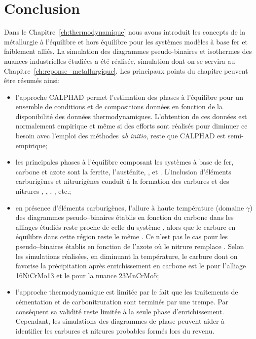 \clearpage\section{Conclusion}

Dans le Chapitre~\ref{ch:thermodynamique} nous avons introduit les concepts de la métallurgie à l'équilibre et hors équilibre pour les systèmes modèles à base fer et faiblement alliés. La simulation des diagrammes pseudo-binaires et isothermes des nuances industrielles étudiées a été réalisée, simulation dont on se servira au Chapitre~\ref{ch:reponse_metallurgique}. Les principaux points du chapitre peuvent être résumés ainsi:
\begin{itemize}
  \item l'approche CALPHAD permet l'estimation des phases à l'équilibre pour un ensemble de conditions et de compositions données en fonction de la disponibilité des données thermodynamiques. L'obtention de ces données est normalement empirique et même si des efforts sont réalisés pour diminuer ce besoin avec l'emploi des méthodes \textit{ab initio}, reste que CALPHAD est semi-empirique;
  
  \item les principales phases à l'équilibre composant les systèmes à base de fer, carbone et azote sont la ferrite, l'austénite, ,  et . L'inclusion d'éléments carburigènes et nitrurigènes conduit à la formation des carbures et des nitrures , , , , etc.;
  
  \item en présence d'éléments carburigènes, l'allure à haute température (domaine  $\gamma$) des diagrammes pseudo--binaires établis en fonction du carbone dans les alliages étudiés reste proche de celle du système , alors que le carbure en équilibre dans cette région reste le même . Ce n'est pas le cas pour les pseudo--binaires établis en fonction de l'azote où le nitrure  remplace . Selon les simulations réalisées, en diminuant la température, le carbure dont on favorise la précipitation après enrichissement en carbone est le  pour l'alliage 16NiCrMo13 et le  pour la nuance 23MnCrMo5;
  
  \item l'approche thermodynamique est limitée par le fait que les traitements de cémentation et de carbonitruration sont terminés par une trempe. Par conséquent sa validité reste limitée à la seule phase d'enrichissement. Cependant, les simulations des diagrammes de phase peuvent aider à identifier les carbures et nitrures probables formés lors du revenu.
\end{itemize}

\endinput